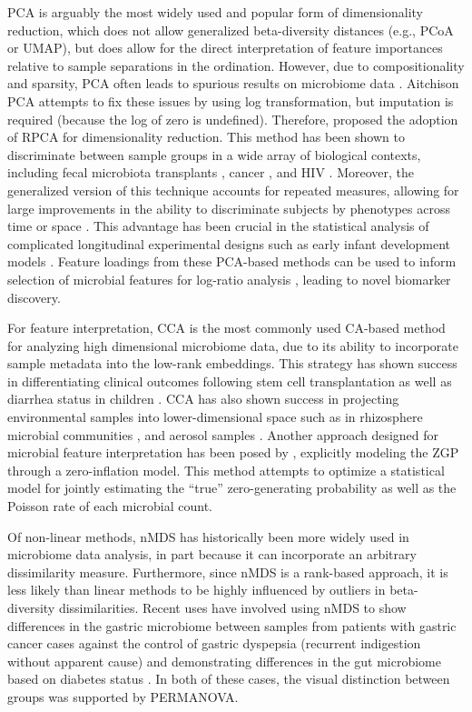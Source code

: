 PCA is arguably the most widely used and popular form of dimensionality reduction, which does not allow generalized beta-diversity distances (e.g., PCoA or UMAP), but does allow for the direct interpretation of feature importances relative to sample separations in the ordination. However, due to compositionality and sparsity, PCA often leads to spurious results on microbiome data \cite{Morton2017-bs,Hamady2009-jd}. Aitchison PCA attempts to fix these issues by using log transformation, but imputation is required (because the log of zero is undefined). Therefore, \cite{Martino2019-op} proposed the adoption of RPCA for dimensionality reduction. This method has been shown to discriminate between sample groups in a wide array of biological contexts, including fecal microbiota transplants \cite{Goloshchapov2019-pe}, cancer \cite{Bali2021-nw}, and HIV \cite{Parbie2021-mm}. Moreover, the generalized version of this technique accounts for repeated measures, allowing for large improvements in the ability to discriminate subjects by phenotypes across time or space \cite{Martino2021-wa}. This advantage has been crucial in the statistical analysis of complicated longitudinal experimental designs such as early infant development models \cite{Song2021-bi}. Feature loadings from these PCA-based methods can be used to inform selection of microbial features for log-ratio analysis \cite{Fedarko2020-oy,Morton2019-me}, leading to novel biomarker discovery.

For feature interpretation, CCA is the most commonly used CA-based method for analyzing high dimensional microbiome data, due to its ability to incorporate sample metadata into the low-rank embeddings. This strategy has shown success in differentiating clinical outcomes following stem cell transplantation \cite{Ingham2019-ei} as well as diarrhea status in children \cite{Dinleyici2018-ka}. CCA has also shown success in projecting environmental samples into lower-dimensional space such as in rhizosphere microbial communities \cite{Benitez2017-xy,Perez-Jaramillo2017-vt}, and aerosol samples \cite{Souza2021-ce}. Another approach designed for microbial feature interpretation has been posed by \cite{Xu2021-uk}, explicitly modeling the ZGP through a zero-inflation model. This method attempts to optimize a statistical model for jointly estimating the “true” zero-generating probability as well as the Poisson rate of each microbial count.

Of non-linear methods, nMDS has historically been more widely used in microbiome data analysis, in part because it can incorporate an arbitrary dissimilarity measure. Furthermore, since nMDS is a rank-based approach, it is less likely than linear methods to be highly influenced by outliers in beta-diversity dissimilarities. Recent uses have involved using nMDS to show differences in the gastric microbiome between samples from patients with gastric cancer cases against the control of gastric dyspepsia (recurrent indigestion without apparent cause) \cite{Castano-Rodriguez2017-ns} and demonstrating differences in the gut microbiome based on diabetes status \cite{Das2021-dw}. In both of these cases, the visual distinction between groups was supported by PERMANOVA.

